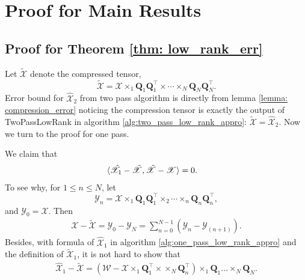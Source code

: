 


\section{Proof for Main Results}
\subsection{Proof for Theorem \ref{thm: low_rank_err}}
Let $\tilde{\mathscr{X}}$ denote the compressed tensor, 
\begin{equation}
\label{eq:definition_of_compression_tensor}
\tilde{\mathscr{X}} = \mathscr{X}\times_1  \mathbf{Q}_1\mathbf{Q}_1^\top \times \cdots \times_N \mathbf{Q}_N\mathbf{Q}_N^\top.
\end{equation}
Error bound for $\hat{\mathscr{X}}_2$ from two pass algorithm is directly from lemma \ref{lemma: compression_error} noticing the compression tensor is exactly the output of TwoPassLowRank in algorithm \ref{alg:two_pass_low_rank_appro}: $\tilde{\mathscr{X}} = \hat{\mathscr{X}}_2$. Now we turn to the proof for one pass. \par 
We claim that 
\begin{equation}
\label{eq:inner_zero}
\begin{aligned}
&\langle \hat{\mathscr{X}}_1 - \Tilde{\mathscr{X}}, \Tilde{\mathscr{X}} - \mathscr{X} \rangle = 0. 
\end{aligned}
\end{equation}
To see why, for $1 \leq n \leq N$, let 
\begin{equation} 
\label{eq:definition_Y_n}
\mathscr{Y}_n = \mathscr{X} \times_1 \mathbf{Q}_1\mathbf{Q}_1^\top \times_2 \cdots \times_n \mathbf{Q}_n\mathbf{Q}_n^\top,
\end{equation}
and $\mathscr{Y}_0 = \mathscr{X}$. 
Then 
\begin{equation}\label{eq: y_diff}
\begin{aligned}
\mathscr{X}-\tilde{\mathscr{X}} = \mathscr{Y}_0 - \mathscr{Y}_N= \sum_{n=0}^{N-1} (\mathscr{Y}_n - \mathscr{Y}_{(n+1)}).
\end{aligned}
\end{equation}
Besides, with formula of $\hat{\mathscr{X}}_1$ in algorithm \ref{alg:one_pass_low_rank_appro} and the definition of $\tilde{\mathscr{X}}_1$, it is not hard to show that 
\begin{equation}
\begin{aligned}
\mathscr{\hat{X}}_1-\tilde{\mathscr{X}}= (\mathscr{W}-\mathscr{X}\times_1 \mathbf{Q}_1^\top \times \times_N \mathbf{Q}_n^\top)  \times_1 \mathbf{Q}_1 \dots \times_N \mathbf{Q}_N. 
\end{aligned}
\end{equation}
